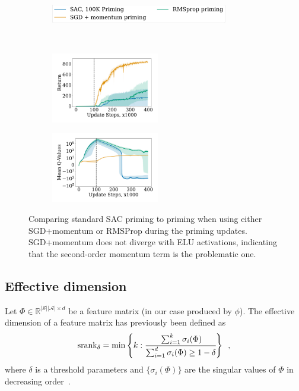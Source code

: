 \begin{figure}[H]
\centering
    \begin{subfigure}[b]{0.8\textwidth}
        \centering
        \includegraphics[height=0.8cm]{figures/dissecting/priming/elu_priming_opt_return_legend.pdf}
    \end{subfigure}\\%
    \begin{subfigure}[b]{0.33\textwidth}
        \centering
        \includegraphics[width=4.7cm, trim=1cm 1cm 1cm 1cm ,clip]{figures/dissecting/priming/elu_priming_opt_return.pdf}
        \label{subfig:priming_opt_ret}
    \end{subfigure}%
    \begin{subfigure}[b]{0.33\textwidth}
    \centering
        \includegraphics[width=4.7cm, trim=1cm 1cm 1cm 1cm ,clip]{figures/dissecting/priming/elu_priming_opt_Q.pdf}
        \label{subfig:priming_opt_Q}
    \end{subfigure}%
    \vspace{-5pt}
    \caption{Comparing standard SAC priming to priming when using either SGD+momentum or RMSProp during the priming updates. SGD+momentum does not diverge with ELU activations, indicating that the second-order momentum term is the problematic one.}
    \label{fig:priming_opt}
\end{figure}

\subsection{Effective dimension} \label{app:priming_dim}

Let $\Phi \in \mathbb{R}^{|\mathcal{S}| |\mathcal{A}| \times d}$ be a feature matrix (in our case produced by $\phi$). The effective dimension of a feature matrix has previously been defined as 
\begin{equation*}
    \text{srank}_{\delta} = \min 
    \left\{ k : \cfrac{\sum_{i=1}^k \sigma_i(\Phi)}{\sum_{i=1}^d \sigma_i(\Phi) \geq 1 - \delta}
    \right\} \enspace ,
\end{equation*}
where $\delta$ is a threshold parameters and $\{\sigma_i(\Phi)\}$ are the singular values of $\Phi$ in decreasing order~\parencite{yang2020harnessing, kumar2021implicit}.

